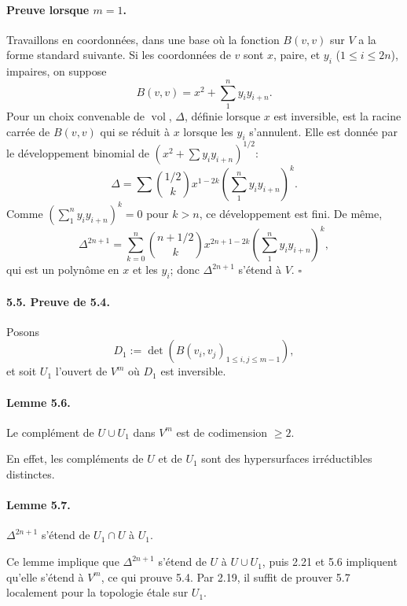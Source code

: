 \documentclass[11pt]{article}
\begin{document}
\paragraph{Preuve lorsque $m=1$.}
Travaillons en coordonnées, dans une base où la fonction $B(v,v)$ sur $V$ a la forme standard suivante. Si les coordonnées de $v$ sont $x$, paire, et $y_i$ ($1\le i\le 2n$), impaires, on suppose
\begin{equation}
\label{eq:541}
B(v,v)=x^2+\sum_1^n y_i y_{i+n}.
\end{equation}
Pour un choix convenable de $\operatorname{vol}$, $\Delta$, définie lorsque $x$ est inversible, est la racine carrée de $B(v,v)$ qui se réduit à $x$ lorsque les $y_i$ s'annulent. Elle est donnée par le développement binomial de $(x^2+\sum y_i y_{i+n})^{1/2}$:
\begin{equation}
\label{eq:542}
\Delta=\sum \binom{1/2}{k}x^{1-2k}\left(\sum_1^n y_i y_{i+n}\right)^k.
\end{equation}
Comme $(\sum_1^n y_i y_{i+n})^k=0$ pour $k>n$, ce développement est fini. De même,
\begin{equation}
\label{eq:543}
\Delta^{2n+1}=\sum_{k=0}^n\binom{n+1/2}{k}x^{2n+1-2k}\left(\sum_1^n y_i y_{i+n}\right)^k,
\end{equation}
qui est un polynôme en $x$ et les $y_i$; donc $\Delta^{2n+1}$ s'étend à $V$. \hfill $\square$

\paragraph{5.5. Preuve de 5.4.}
Posons
\[
D_1:=\det(B(v_i,v_j)_{1\leq i,j\leq m-1}),
\]
et soit $U_1$ l'ouvert de $V^m$ où $D_1$ est inversible.

\paragraph{Lemme 5.6.}
Le complément de $U\cup U_1$ dans $V^m$ est de codimension $\ge2$.

En effet, les compléments de $U$ et de $U_1$ sont des hypersurfaces irréductibles distinctes.

\paragraph{Lemme 5.7.}
$\Delta^{2n+1}$ s'étend de $U_1\cap U$ à $U_1$.

Ce lemme implique que $\Delta^{2n+1}$ s'étend de $U$ à $U\cup U_1$, puis 2.21 et 5.6 impliquent qu'elle s'étend à $V^m$, ce qui prouve 5.4. Par 2.19, il suffit de prouver 5.7 localement pour la topologie étale sur $U_1$.
\end{document}
